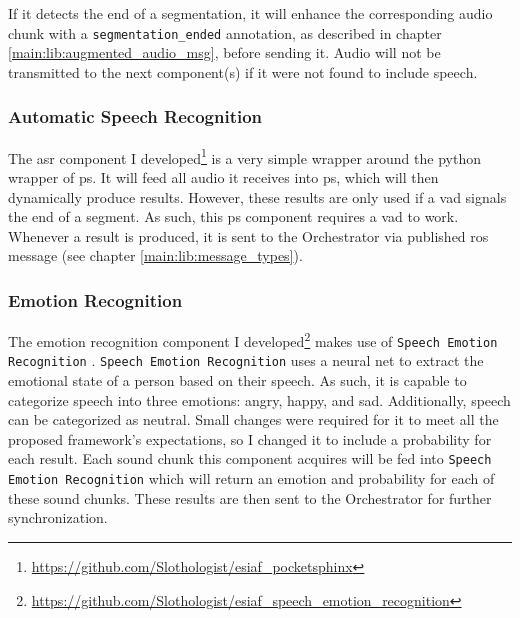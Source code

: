 If it detects the end of a segmentation, it will enhance the corresponding audio chunk with a \texttt{segmentation\_ended} annotation, as described in chapter \ref{main:lib:augmented_audio_msg}, before sending it.
Audio will not be transmitted to the next component(s) if it were not found to include speech.

\subsubsection{Automatic Speech Recognition}
\label{main:components:ps}
The \gls{asr} component I developed\footnote{\url{https://github.com/Slothologist/esiaf_pocketsphinx}} is a very simple wrapper around the python wrapper of \gls{ps}.
It will feed all audio it receives into \gls{ps}, which will then dynamically produce results.
However, these results are only used if a \gls{vad} signals the end of a segment.
As such, this \gls{ps} component requires a \gls{vad} to work.
Whenever a result is produced, it is sent to the Orchestrator via published \gls{ros} message (see chapter \ref{main:lib:message_types}).

\subsubsection{Emotion Recognition}
\label{main:components:emotion}
The emotion recognition component I developed\footnote{\url{https://github.com/Slothologist/esiaf_speech_emotion_recognition}} makes use of \texttt{Speech Emotion Recognition} \cite{speech-em-rec}.
\texttt{Speech Emotion Recognition} uses a neural net to extract the emotional state of a person based on their speech.
As such, it is capable to categorize speech into three emotions: angry, happy, and sad.
Additionally, speech can be categorized as neutral.
Small changes were required for it to meet all the proposed framework's expectations, so I changed it to include a probability for each result. %
Each sound chunk this component acquires will be fed into \texttt{Speech Emotion Recognition} which will return an emotion and probability for each of these sound chunks.
These results are then sent to the Orchestrator for further synchronization.

